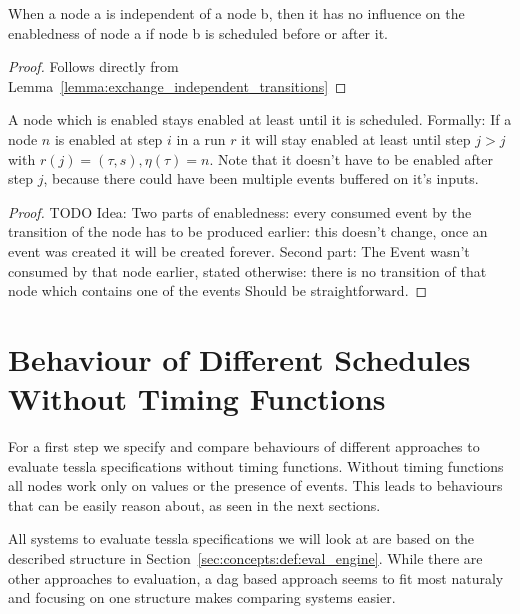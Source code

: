 \begin{lemma}[name = Influence of Independent Nodes]\label{lemma:independent_nodes}
  When a node a is independent of a node b, then it has no influence on the enabledness of node a if node b is scheduled before or after it.
\end{lemma}

\begin{proof}
  Follows directly from Lemma~\ref{lemma:exchange_independent_transitions}
\end{proof}

\begin{lemma}[name = Duration of Enabledness]\label{lemma:enabled_till_scheduled}
  A node which is enabled stays enabled at least until it is scheduled.
  Formally: If a node \(n\) is enabled at step \(i\) in a run \(r\) it will stay enabled at least until step \(j > j\) with \(r(j) = (\tau,s), \eta(\tau) = n\).
  Note that it doesn't have to be enabled after step \(j\), because there could have been multiple events buffered on it's inputs.
\end{lemma}

\begin{proof}
TODO Idea: Two parts of enabledness: every consumed event by the transition of the node has to be produced earlier: this doesn't change, once an event was created it will be created forever.
Second part: The Event wasn't consumed by that node earlier, stated otherwise: there is no transition of that node which contains one of the events
Should be straightforward.
\end{proof}


\section{Behaviour of Different Schedules Without Timing Functions}
\label{sec:concepts:behaviour_without_timing}

For a first step we specify and compare behaviours of different approaches to evaluate \gls{tessla} specifications without timing functions.
Without timing functions all nodes work only on values or the presence of events.
This leads to behaviours that can be easily reason about, as seen in the next sections.

All systems to evaluate \gls{tessla} specifications we will look at are based on the described structure in Section~\ref{sec:concepts:def:eval_engine}.
While there are other approaches to evaluation, a \gls{dag} based approach seems to fit most naturaly and focusing on one structure makes comparing systems easier.

